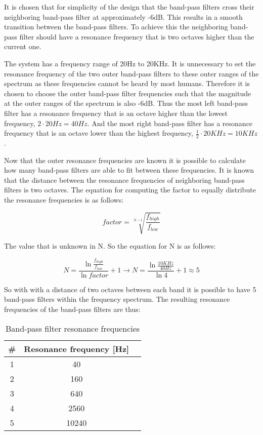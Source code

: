 It is chosen that for simplicity of the design that the band-pass filters cross their neighboring band-pass filter at approximately -6dB. This results in a smooth transition between the band-pass filters. To achieve this the neighboring band-pass filter should have a resonance frequency that is two octaves higher than the current one.

The system has a frequency range of 20Hz to 20KHz. It is unnecessary to set the resonance frequency of the two outer band-pass filters to these outer ranges of the spectrum as these frequencies cannot be heard by most humans. Therefore it is chosen to choose the outer band-pass filter frequencies such that the magnitude at the outer ranges of the spectrum is also -6dB. Thus the most left band-pass filter has a resonance frequency that is an octave higher than the lowest frequency, $2\cdot20Hz=40Hz$. And the most right band-pass filter has a resonance frequency that is an octave lower than the highest frequency, $\frac{1}{2}\cdot20KHz=10KHz$.

Now that the outer resonance frequencies are known it is possible to calculate how many band-pass filters are able to fit between these frequencies. It is known that the distance between the resonance frequencies of neighboring band-pass filters is two octaves. The equation for computing the factor to equally distribute the resonance frequencies is as follows: 

\begin{equation}
    factor=\sqrt[N-1]{\frac{f_{high}}{f_{low}}}
\end{equation}

The value that is unknown in N. So the equation for N is as follows: 

\begin{equation}
    N=\frac{\ln\frac{f_{high}}{f_{low}}}{\ln{factor}}+1\rightarrow N=\frac{\ln\frac{10KHz}{40Hz}}{\ln{4}}+1\approx 5
\end{equation}

So with with a distance of two octaves between each band it is possible to have 5 band-pass filters within the frequency spectrum. The resulting resonance frequencies of the band-pass filters are thus: 

\begin{table}[h!]
    \centering
    \begin{tabular}{|c|c|c|}
        \hline
        \# & Resonance frequency [Hz]\\
        \hline
        1 & 40\\
        \hline
        2 & 160\\
        \hline
        3 & 640\\
        \hline
        4 & 2560\\
        \hline
        5 & 10240\\
        \hline
    \end{tabular}
    \caption{Band-pass filter resonance frequencies}
    \label{table:bpf-filters-frequencies}
\end{table}

